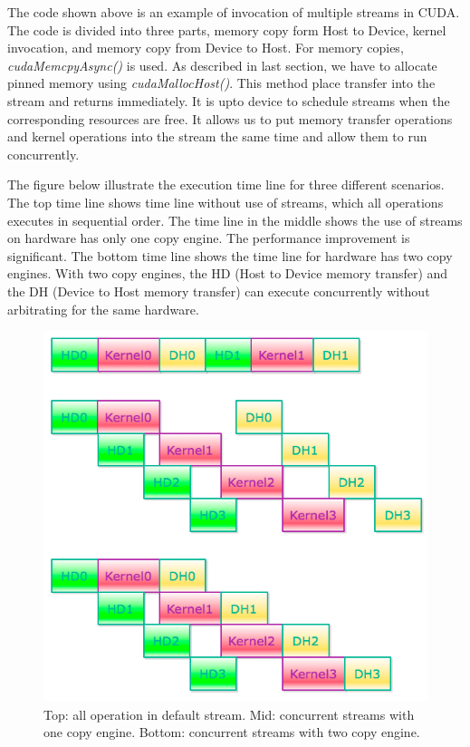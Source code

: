 \documentclass[journal,12pt,onecolumn,draftclsnofoot]{ieeeconf}  %
\begin{document}
The code shown above is an example of invocation of multiple streams in CUDA. The code is divided into three parts, memory copy form Host to Device, kernel invocation, and memory copy from Device to Host. For memory copies, \textit{cudaMemcpyAsync()} is used. As described in last section, we have to allocate pinned memory using \textit{cudaMallocHost()}. This method place transfer into the stream and returns immediately. It is upto device to schedule streams when the corresponding resources are free. It allows us to put memory transfer operations and kernel operations into the stream the same time and allow them to run concurrently.\cite{Stream} \par
The figure below illustrate the execution time line for three different scenarios. The top time line shows time line without use of streams, which all operations executes in sequential order. The time line in the middle shows the use of streams on hardware has only one copy engine. The performance improvement is significant. The bottom time line shows the time line for hardware has two copy engines. With two copy engines, the HD (Host to Device memory transfer) and the DH (Device to Host memory transfer) can execute concurrently without arbitrating for the same hardware. \par 
\begin{figure}[h]
	\centering\includegraphics[width=120mm]{concurrent.png}
	\caption{Top: all operation in default stream. Mid: concurrent streams with one copy engine. Bottom: concurrent streams with two copy engine.}
	\label{concurrent}
\end{figure}
\end{document}
